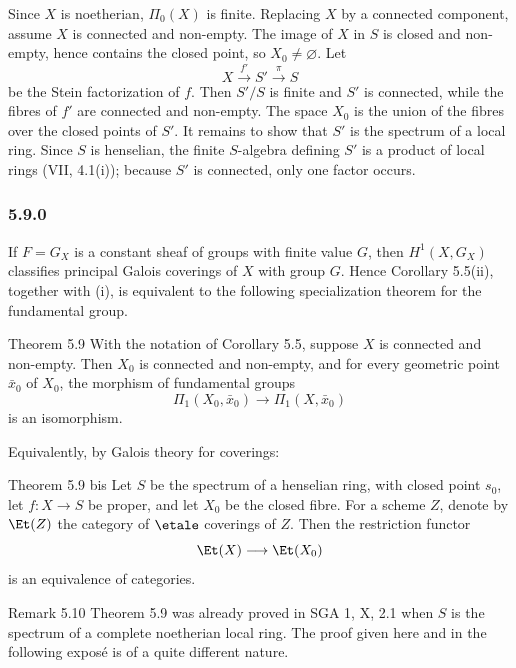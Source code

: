 \begin{prooftext}
Since \(X\) is noetherian, \(\Pi_0(X)\) is finite. Replacing \(X\) by a connected component, assume \(X\) is connected and non-empty. The image of \(X\) in \(S\) is closed and non-empty, hence contains the closed point, so \(X_0\ne\varnothing\). Let
\[
X\xrightarrow{f'}S'\xrightarrow{\pi}S
\]
be the Stein factorization of \(f\). Then \(S'/S\) is finite and \(S'\) is connected, while the fibres of \(f'\) are connected and non-empty. The space \(X_0\) is the union of the fibres over the closed points of \(S'\). It remains to show that \(S'\) is the spectrum of a local ring. Since \(S\) is henselian, the finite \(S\)-algebra defining \(S'\) is a product of local rings (VII, 4.1(i)); because \(S'\) is connected, only one factor occurs.
\end{prooftext}

\subsubsection*{5.9.0}
If \(F=G_X\) is a constant sheaf of groups with finite value \(G\), then \(H^1(X,G_X)\) classifies principal Galois coverings of \(X\) with group \(G\). Hence Corollary 5.5(ii), together with (i), is equivalent to the following specialization theorem for the fundamental group.

\begin{statement}{Theorem 5.9}
With the notation of Corollary 5.5, suppose \(X\) is connected and non-empty. Then \(X_0\) is connected and non-empty, and for every geometric point \(\bar x_0\) of \(X_0\), the morphism of fundamental groups
\[
\Pi_1(X_0,\bar x_0)\longrightarrow\Pi_1(X,\bar x_0)
\]
is an isomorphism.
\end{statement}

Equivalently, by Galois theory for coverings:

\begin{statement}{Theorem 5.9 bis}
Let \(S\) be the spectrum of a henselian ring, with closed point \(s_0\), let \(f:X\to S\) be proper, and let \(X_0\) be the closed fibre. For a scheme \(Z\), denote by \(\Et(Z)\) the category of \(\etale\) coverings of \(Z\). Then the restriction functor
\[
\Et(X)\longrightarrow\Et(X_0)
\]
is an equivalence of categories.
\end{statement}

\begin{remarktext}{Remark 5.10}
Theorem 5.9 was already proved in SGA 1, X, 2.1 when \(S\) is the spectrum of a complete noetherian local ring. The proof given here and in the following expos\'e is of a quite different nature.
\end{remarktext}

